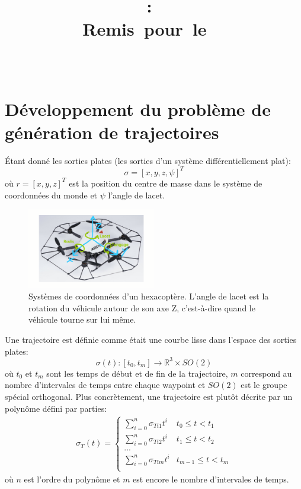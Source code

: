 \documentclass{article}
\title{
    \vspace{2in}
    \textmd{\textbf{\hmwkClass:\ \hmwkTitle}}\\
    \normalsize\vspace{0.1in}\small{Remis\ pour\ le\ \hmwkDueDate\ }\\
    \vspace{0.1in}\large{\textit{\hmwkClassInstructor\ \hmwkClassTime}}
    \vspace{3in}
}
\author{\textbf{\hmwkAuthorName}}
\date{}
\begin{document}
\maketitle

\pagebreak


\section{Développement du problème de génération de trajectoires}
Étant donné les sorties plates (les sorties d'un système différentiellement plat):
\begin{equation}
\sigma = [x, y, z, \psi]^T
\end{equation}
où $r = [x, y, z]^T$ est la position du centre de masse dans le système de coordonnées du monde et $\psi$ l'angle de lacet.

\begin{figure}[h]
	\centering
	\includegraphics[width=0.5\textwidth]{fig/firefly.png}
	\caption{Systèmes de coordonnées d'un hexacoptère. L'angle de lacet est la rotation du véhicule autour de son axe Z, c'est-à-dire quand le véhicule tourne sur lui même.}
\end{figure}

Une trajectoire est définie comme était une courbe lisse dans l'espace des sorties plates:
$$ \sigma(t) : [t_0, t_m] \rightarrow \mathbb{R}^3 \times SO(2)$$ 
où $t_0$ et $t_m$ sont les temps de début et de fin de la trajectoire, $m$ correspond au nombre d'intervales de temps entre chaque waypoint et $SO(2)$ est le groupe spécial orthogonal. Plus concrètement, une trajectoire est plutôt décrite par un polynôme défini par parties:
\begin{align}\label{eq:polynomial}
\sigma_T(t) =
\left\{
	\begin{array}{ll}
		\sum_{i=0}^n \sigma_{Ti1} t^i  & t_0 \leq t < t_1 \\
		\sum_{i=0}^n \sigma_{Ti2} t^i  & t_1 \leq t < t_2 \\
		... \\
		\sum_{i=0}^n \sigma_{Tim} t^i  & t_{m-1} \leq t < t_m \\
	\end{array}
\right.
\end{align}
où $n$ est l'ordre du polynôme et $m$ est encore le nombre d'intervales de temps.
\end{document}
